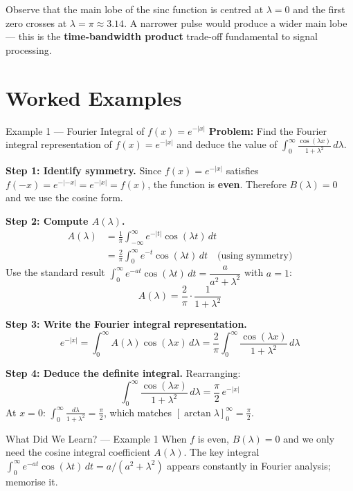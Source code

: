 \documentclass[12pt,a4paper]{article}
\begin{document}
Observe that the main lobe of the sinc function is centred at $\lambda=0$ and the first zero crosses at $\lambda=\pi\approx3.14$. A narrower pulse would produce a wider main lobe --- this is the \textbf{time-bandwidth product} trade-off fundamental to signal processing.

\section{Worked Examples}

\begin{infobox}{Example 1 --- Fourier Integral of $f(x)=e^{-|x|}$}
\textbf{Problem:} Find the Fourier integral representation of $f(x)=e^{-|x|}$ and deduce the value of
$\displaystyle\int_0^\infty\frac{\cos(\lambda x)}{1+\lambda^2}\,d\lambda$.

\textbf{Step 1: Identify symmetry.}
Since $f(x)=e^{-|x|}$ satisfies $f(-x)=e^{-|-x|}=e^{-|x|}=f(x)$, the function is \textbf{even}.
Therefore $B(\lambda)=0$ and we use the cosine form.

\textbf{Step 2: Compute $A(\lambda)$.}
\begin{align*}
A(\lambda) &= \frac{1}{\pi}\int_{-\infty}^{\infty} e^{-|t|}\cos(\lambda t)\,dt \\
           &= \frac{2}{\pi}\int_0^{\infty} e^{-t}\cos(\lambda t)\,dt \quad \text{(using symmetry)}
\end{align*}
Use the standard result $\int_0^\infty e^{-at}\cos(\lambda t)\,dt = \dfrac{a}{a^2+\lambda^2}$ with $a=1$:
\[
A(\lambda) = \frac{2}{\pi}\cdot\frac{1}{1+\lambda^2}
\]

\textbf{Step 3: Write the Fourier integral representation.}
\[
e^{-|x|} = \int_0^\infty A(\lambda)\cos(\lambda x)\,d\lambda = \frac{2}{\pi}\int_0^\infty \frac{\cos(\lambda x)}{1+\lambda^2}\,d\lambda
\]

\textbf{Step 4: Deduce the definite integral.}
Rearranging:
\[
\int_0^\infty\frac{\cos(\lambda x)}{1+\lambda^2}\,d\lambda = \frac{\pi}{2}\,e^{-|x|}
\]
At $x=0$: $\displaystyle\int_0^\infty\frac{d\lambda}{1+\lambda^2} = \frac{\pi}{2}$, which matches $[\arctan\lambda]_0^\infty = \frac{\pi}{2}$. \checkmark
\end{infobox}

\begin{learnbox}{What Did We Learn? --- Example 1}
When $f$ is even, $B(\lambda)=0$ and we only need the cosine integral coefficient $A(\lambda)$. The key integral $\int_0^\infty e^{-at}\cos(\lambda t)\,dt = a/(a^2+\lambda^2)$ appears constantly in Fourier analysis; memorise it.
\end{learnbox}
\end{document}
